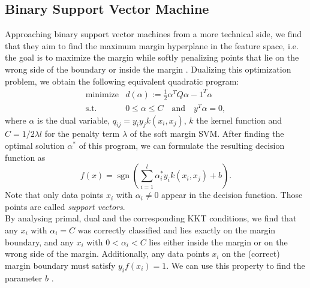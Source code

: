 \subsection{Binary Support Vector Machine}


Approaching binary support vector machines from a more technical side, we find that they aim to find the maximum margin hyperplane in the feature space, i.e. the goal is to maximize the margin while softly penalizing points that lie on the wrong side of the boundary or inside the margin \cite{Bishop2006}. Dualizing this optimization problem, we obtain the following equivalent quadratic program:
\begin{equation}\label{dual_problem}
\begin{array}{rl}
\text{minimize} & d(\alpha) := \frac{1}{2} \alpha^T Q \alpha - 1^T \alpha \\
\text{s.t.} &  0 \leq \alpha \leq C  \quad \text{and} \quad 	y^T \alpha = 0,
\end{array}
\end{equation}
where $\alpha$ is the dual variable, $q_{ij} = y_i y_j k(x_i,x_j)$, $k$ the kernel function and $C = 1/2 \lambda l$ for the penalty term $\lambda$ of the soft margin SVM.
After finding the optimal solution $\alpha^*$ of this program, we can formulate the resulting decision function as
\begin{equation*}
f(x) = \operatorname{sgn}\left(\sum_{i=1}^{l}\alpha^*_i y_i k(x_i,x_j)+b\right).
\end{equation*}
Note that only data points $x_i$ with $\alpha_i \neq 0$ appear in the decision function. Those points are called \textit{support vectors}.\\
By analysing primal, dual and the corresponding KKT conditions, we find that any $x_i$ with $\alpha_i = C$ was correctly classified and lies exactly on the margin boundary, and any $x_i$ with $0<\alpha_i < C$ lies either inside the margin or on the wrong side of the margin. Additionally, any data points $x_i$ on the (correct) margin boundary must satisfy $y_i f(x_i) = 1$. We can use this property to find the parameter $b$ \cite{Bishop2006}.


